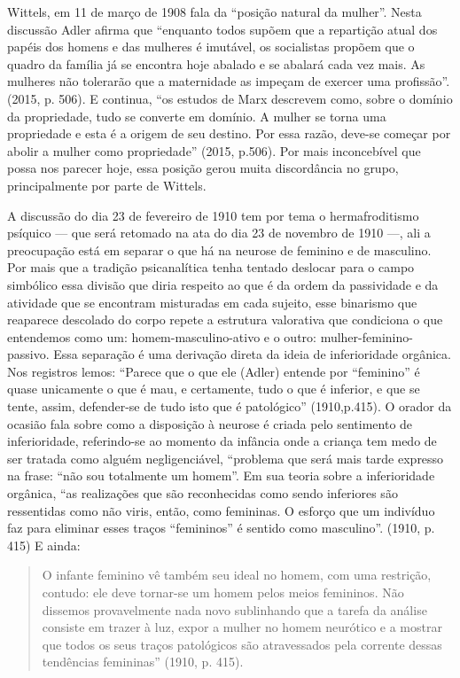 Wittels, em 11 de março de 1908 fala da ``posição natural da mulher''.
Nesta discussão Adler afirma que ``enquanto todos supõem que a repartição
atual dos papéis dos homens e das mulheres é imutável, os socialistas
propõem que o quadro da família já se encontra hoje abalado e se abalará
cada vez mais. As mulheres não tolerarão que a maternidade as impeçam de
exercer uma profissão''. (2015, p. 506). E continua, ``os estudos de Marx
descrevem como, sobre o domínio da propriedade, tudo se converte em
domínio. A mulher se torna uma propriedade e esta é a origem de seu
destino. Por essa razão, deve-se começar por abolir a mulher como
propriedade'' (2015, p.506). Por mais inconcebível que possa nos parecer
hoje, essa posição gerou muita discordância no grupo, principalmente por
parte de Wittels.

A discussão do dia 23 de fevereiro de 1910 tem por tema o
hermafroditismo psíquico --- que será retomado na ata do dia 23 de
novembro de 1910 ---, ali a preocupação está em separar o que há na
neurose de feminino e de masculino. Por mais que a tradição
psicanalítica tenha tentado deslocar para o campo simbólico essa divisão
que diria respeito ao que é da ordem da passividade e da atividade que
se encontram misturadas em cada sujeito, esse binarismo que reaparece
descolado do corpo repete a estrutura valorativa que condiciona o que
entendemos como um: homem-masculino-ativo e o outro:
mulher-feminino-passivo. Essa separação é uma derivação direta da ideia
de inferioridade orgânica. Nos registros lemos: ``Parece que o que ele
(Adler) entende por ``feminino'' é quase unicamente o que é mau, e
certamente, tudo o que é inferior, e que se tente, assim, defender-se de
tudo isto que é patológico'' (1910,p.415). O orador da ocasião fala
sobre como a disposição à neurose é criada pelo sentimento de
inferioridade, referindo-se ao momento da infância onde a criança tem
medo de ser tratada como alguém negligenciável, ``problema que será mais
tarde expresso na frase: ``não sou totalmente um homem''. Em sua teoria
sobre a inferioridade orgânica, ``as realizações que são reconhecidas
como sendo inferiores são ressentidas como não viris, então, como
femininas. O esforço que um indivíduo faz para eliminar esses traços
``femininos'' é sentido como masculino''. (1910, p. 415) E ainda:

\begin{quote}
O infante feminino vê também seu ideal no homem, com uma restrição,
contudo: ele deve tornar-se um homem pelos meios femininos. Não dissemos
provavelmente nada novo sublinhando que a tarefa da análise consiste em
trazer à luz, expor a mulher no homem neurótico e a mostrar que todos os
seus traços patológicos são atravessados pela corrente dessas tendências
femininas'' (1910, p. 415).
\end{quote}

